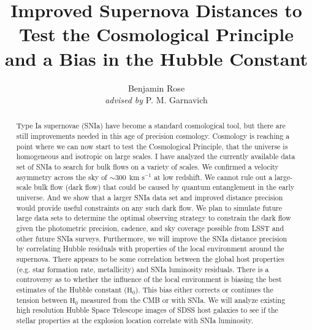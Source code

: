 \documentclass[apj, iop]{emulateapj}
\newcommand{\sn}{SNIa}
\newcommand{\Hubble}{\ensuremath{\text{H}_0}}
\newcommand{\kms}{\ensuremath{~\text{km s}^{-1}}}
\begin{document}
\title{Improved Supernova Distances to Test the Cosmological Principle \\and a Bias in the Hubble Constant}

\author{Benjamin Rose \\{\it advised by} P. M. Garnavich}



\begin{abstract} 

Type Ia supernovae (\sn{}) have become a standard cosmological tool, but there
are still improvements needed in this age of precision cosmology.  Cosmology  is
reaching a point where we can now start to test the Cosmological Principle, that
the universe is homogeneous and isotropic on large scales.  I have analyzed the
currently available data set of \sn{} to search for bulk flows on a variety of
scales. We confirmed a velocity asymmetry across the sky of $\sim 300~\kms{}$ at
low redshift. We cannot rule out a large-scale bulk flow (dark flow) that could
be caused by quantum entanglement in the early universe. And we show that a
larger \sn{} data set and improved distance precision would provide useful
constraints on any such dark flow. We plan to simulate future large data sets to
determine the optimal observing strategy to constrain the dark flow given the
photometric precision, cadence, and sky coverage possible from LSST and other
future \sn{} surveys.  Furthermore, we will improve the \sn{} distance precision
by correlating Hubble residuals with properties of the local environment around
the supernova. There appears to be some correlation between the global host
properties (e.g. star formation rate, metallicity) and \sn{} luminosity
residuals. There is a controversy as to whether the influence of the local
environment is biasing the best estimates of the Hubble constant (\Hubble{}).
This bias either corrects or continues the tension between \Hubble{} measured
from the CMB or with \sn{}. We will analyze existing high resolution Hubble
Space Telescope images of SDSS host galaxies to see if the stellar properties at
the explosion location correlate with \sn{} luminosity.

\end{abstract}
\end{document}

